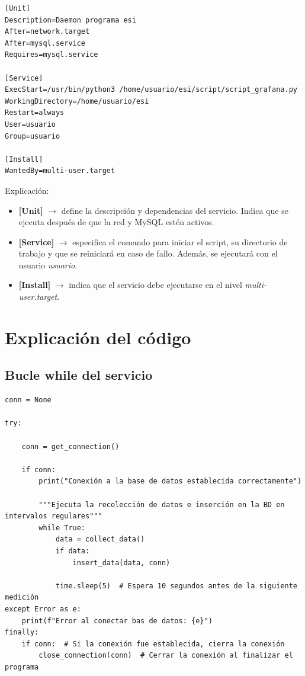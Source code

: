\documentclass{article}
\begin{document}
\begin{verbatim}
[Unit]
Description=Daemon programa esi
After=network.target
After=mysql.service
Requires=mysql.service

[Service]
ExecStart=/usr/bin/python3 /home/usuario/esi/script/script_grafana.py
WorkingDirectory=/home/usuario/esi
Restart=always
User=usuario
Group=usuario

[Install]
WantedBy=multi-user.target 
\end{verbatim}

Explicación:

\begin{itemize}
    \item \textbf{[Unit]} $ \rightarrow $ define la descripción y dependencias del servicio. Indica que se ejecuta después de que la red y MySQL estén activos.
    \item \textbf{[Service]} $ \rightarrow $ especifica el comando para iniciar el script, su directorio de trabajo y que se reiniciará en caso de fallo. Además, se ejecutará con el usuario \textit{usuario}.
    \item \textbf{[Install]} $ \rightarrow $ indica que el servicio debe ejecutarse en el nivel \textit{multi-user.target}.
\end{itemize}

\section{Explicación del código}
\subsection{Bucle while del servicio}\label{subsec:bucle-while}

\begin{verbatim}
conn = None

try:
    
    conn = get_connection()

    if conn:
        print("Conexión a la base de datos establecida correctamente")

        """Ejecuta la recolección de datos e inserción en la BD en intervalos regulares"""
        while True:
            data = collect_data()
            if data:
                insert_data(data, conn)

            time.sleep(5)  # Espera 10 segundos antes de la siguiente medición
except Error as e:
    print(f"Error al conectar bas de datos: {e}")
finally:
    if conn:  # Si la conexión fue establecida, cierra la conexión
        close_connection(conn)  # Cerrar la conexión al finalizar el programa
\end{verbatim}
\end{document}
